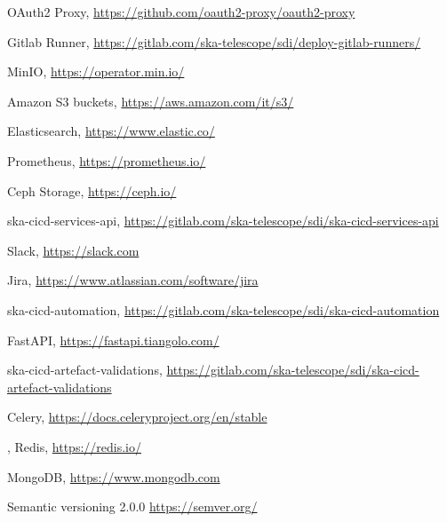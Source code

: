 \documentclass[a4paper,
               keeplastbox,   %
               ]{jacow}
\begin{document}
{\begin{thebibliography}{99}
		OAuth2 Proxy,
		\url{https://github.com/oauth2-proxy/oauth2-proxy}
	
	
		Gitlab Runner,
		\url{https://gitlab.com/ska-telescope/sdi/deploy-gitlab-runners/}
	
		MinIO,
		\url{https://operator.min.io/}
	
		Amazon S3 buckets,
		\url{https://aws.amazon.com/it/s3/}
	
		Elasticsearch,
		\url{https://www.elastic.co/}
	
		Prometheus,
		\url{https://prometheus.io/}
	
		Ceph Storage,
		\url{https://ceph.io/}
	
		ska-cicd-services-api,
		\url{https://gitlab.com/ska-telescope/sdi/ska-cicd-services-api}
	
		Slack,
		\url{https://slack.com}
	
		Jira,
		\url{https://www.atlassian.com/software/jira}
	
		ska-cicd-automation,
		\url{https://gitlab.com/ska-telescope/sdi/ska-cicd-automation}
	
		FastAPI,
		\url{https://fastapi.tiangolo.com/}
	
		ska-cicd-artefact-validations,
		\url{https://gitlab.com/ska-telescope/sdi/ska-cicd-artefact-validations}
	
		Celery,
		\url{https://docs.celeryproject.org/en/stable}
	
	,
		Redis,
		\url{https://redis.io/}
	
		MongoDB,
		\url{https://www.mongodb.com}
	
		Semantic versioning 2.0.0
		\url{https://semver.org/}

	\end{thebibliography}
}
 
\end{document}
